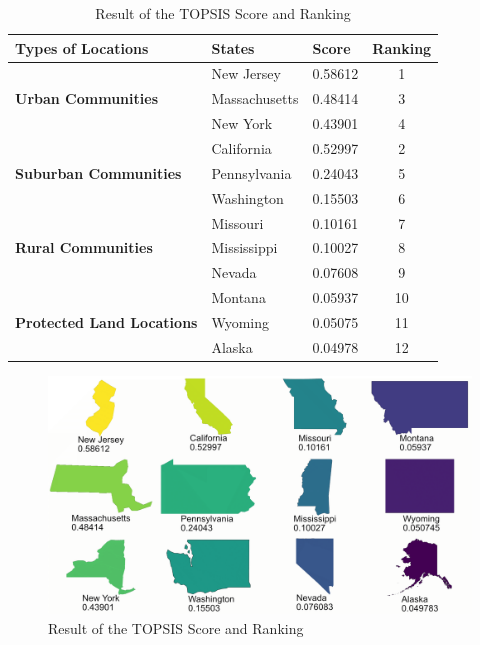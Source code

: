 \begin{table}[H] \centering
    \caption{Result of the TOPSIS Score and Ranking}
    \begin{tabular}{llll}
        \toprule
        Types of Locations & States & Score & Ranking\\ \hline\hline
        \multirow{3}{*}{\textbf{Urban Communities}} & New Jersey & 0.58612 & \multicolumn{1}{c}{1}\\
                            &  Massachusetts & 0.48414 & \multicolumn{1}{c}{3}\\
                           & New York & 0.43901 & \multicolumn{1}{c}{4}\\\hline
        \multirow{3}{*}{\textbf{Suburban Communities}} & California & 0.52997 & \multicolumn{1}{c}{2}\\
                            & Pennsylvania & 0.24043 & \multicolumn{1}{c}{5}\\
                           & Washington & 0.15503 & \multicolumn{1}{c}{6}\\\hline
        \multirow{3}{*}{\textbf{Rural Communities}} & Missouri & 0.10161 & \multicolumn{1}{c}{7}\\
                            & Mississippi & 0.10027 & \multicolumn{1}{c}{8}\\
                           & Nevada & 0.07608 & \multicolumn{1}{c}{9}\\\hline
        \multirow{3}{*}{\textbf{Protected Land Locations}}& Montana & 0.05937 & \multicolumn{1}{c}{10}\\
                            & Wyoming & 0.05075 & \multicolumn{1}{c}{11}\\
                           & Alaska & 0.04978 & \multicolumn{1}{c}{12}\\
        \bottomrule
    \end{tabular}
\end{table}

\begin{figure}[H]\centering
    \includegraphics[width=1\textwidth]{figures/result.png}
    \caption{Result of the TOPSIS Score and Ranking} \label{fig:figure5}
\end{figure}